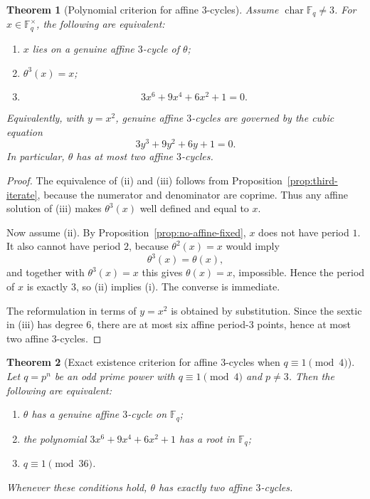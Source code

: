 \documentclass[11pt]{article}
\newtheorem{theorem}{Theorem}
\newcommand{\F}{\mathbb{F}}
\begin{document}
\begin{theorem}[Polynomial criterion for affine $3$-cycles]
\label{thm:three-cycle-poly}
Assume $\operatorname{char}\F_q\neq 3$.
For $x\in\F_q^\times$, the following are equivalent:
\begin{enumerate}[label=\textup{(\roman*)}]
\item $x$ lies on a genuine affine $3$-cycle of $\theta$;
\item $\theta^3(x)=x$;
\item
\[
3x^6+9x^4+6x^2+1=0.
\]
\end{enumerate}
Equivalently, with $y=x^2$, genuine affine $3$-cycles are governed by the cubic equation
\[
3y^3+9y^2+6y+1=0.
\]
In particular, $\theta$ has at most two affine $3$-cycles.
\end{theorem}

\begin{proof}
The equivalence of \textup{(ii)} and \textup{(iii)} follows from Proposition~\ref{prop:third-iterate}, because the numerator and denominator are coprime.
Thus any affine solution of \textup{(iii)} makes $\theta^3(x)$ well defined and equal to $x$.

Now assume \textup{(ii)}.
By Proposition~\ref{prop:no-affine-fixed}, $x$ does not have period $1$.
It also cannot have period $2$, because $\theta^2(x)=x$ would imply
\[
\theta^3(x)=\theta(x),
\]
and together with $\theta^3(x)=x$ this gives $\theta(x)=x$, impossible.
Hence the period of $x$ is exactly $3$, so \textup{(ii)} implies \textup{(i)}.
The converse is immediate.

The reformulation in terms of $y=x^2$ is obtained by substitution.
Since the sextic in \textup{(iii)} has degree $6$, there are at most six affine period-$3$ points, hence at most two affine $3$-cycles.
\end{proof}

\begin{theorem}[Exact existence criterion for affine $3$-cycles when $q\equiv 1\pmod4$]
\label{thm:three-cycle-existence}
Let $q=p^n$ be an odd prime power with $q\equiv 1\pmod4$ and $p\neq 3$.
Then the following are equivalent:
\begin{enumerate}[label=\textup{(\roman*)}]
\item $\theta$ has a genuine affine $3$-cycle on $\F_q$;
\item the polynomial $3x^6+9x^4+6x^2+1$ has a root in $\F_q$;
\item $q\equiv 1\pmod{36}$.
\end{enumerate}
Whenever these conditions hold, $\theta$ has exactly two affine $3$-cycles.
\end{theorem}
\end{document}
